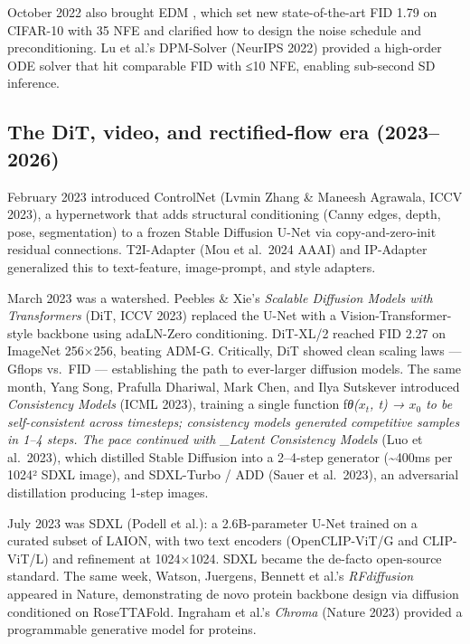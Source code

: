 \documentclass{article}
\begin{document}
October 2022 also brought EDM \citep{karras2022elucidatingthedesi}, which set new state-of-the-art FID 1.79 on CIFAR-10 with 35 NFE and clarified how to design the noise schedule and preconditioning. Lu et al.'s DPM-Solver (NeurIPS 2022) provided a high-order ODE solver that hit comparable FID with ≤10 NFE, enabling sub-second SD inference.

\subsection{The DiT, video, and rectified-flow era (2023--2026)}\label{the-dit-video-and-rectified-flow-era-20232026}

February 2023 introduced ControlNet (Lvmin Zhang \& Maneesh Agrawala, ICCV 2023), a hypernetwork that adds structural conditioning (Canny edges, depth, pose, segmentation) to a frozen Stable Diffusion U-Net via copy-and-zero-init residual connections. T2I-Adapter (Mou et al.~2024 AAAI) and IP-Adapter generalized this to text-feature, image-prompt, and style adapters.

March 2023 was a watershed. Peebles \& Xie's \emph{Scalable Diffusion Models with Transformers} (DiT, ICCV 2023) replaced the U-Net with a Vision-Transformer-style backbone using adaLN-Zero conditioning. DiT-XL/2 reached FID 2.27 on ImageNet 256×256, beating ADM-G. Critically, DiT showed clean scaling laws --- Gflops vs.~FID --- establishing the path to ever-larger diffusion models. The same month, Yang Song, Prafulla Dhariwal, Mark Chen, and Ilya Sutskever introduced \emph{Consistency Models} (ICML 2023), training a single function f\emph{θ(\(x_t\), t) → \(x_0\) to be self-consistent across timesteps; consistency models generated competitive samples in 1--4 steps. The pace continued with \_Latent Consistency Models} (Luo et al.~2023), which distilled Stable Diffusion into a 2--4-step generator (\textasciitilde400ms per 1024² SDXL image), and SDXL-Turbo / ADD (Sauer et al.~2023), an adversarial distillation producing 1-step images.

July 2023 was SDXL (Podell et al.): a 2.6B-parameter U-Net trained on a curated subset of LAION, with two text encoders (OpenCLIP-ViT/G and CLIP-ViT/L) and refinement at 1024×1024. SDXL became the de-facto open-source standard. The same week, Watson, Juergens, Bennett et al.'s \emph{RFdiffusion} appeared in Nature, demonstrating de novo protein backbone design via diffusion conditioned on RoseTTAFold. Ingraham et al.'s \emph{Chroma} (Nature 2023) provided a programmable generative model for proteins.
\end{document}
